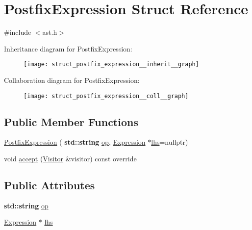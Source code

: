 \hypertarget{struct_postfix_expression}{}\section{Postfix\+Expression Struct Reference}
\label{struct_postfix_expression}


{\ttfamily \#include $<$ast.\+h$>$}



Inheritance diagram for Postfix\+Expression\+:\nopagebreak
\begin{figure}[H]
\begin{center}
\leavevmode
\texttt{[image: struct\_postfix\_expression\_\_inherit\_\_graph]}
\end{center}
\end{figure}


Collaboration diagram for Postfix\+Expression\+:\nopagebreak
\begin{figure}[H]
\begin{center}
\leavevmode
\texttt{[image: struct\_postfix\_expression\_\_coll\_\_graph]}
\end{center}
\end{figure}
\subsection*{Public Member Functions}
\begin{DoxyCompactItemize}
\item 
\hyperlink{struct_postfix_expression_a51cc535ac4af99bef2f292fb1ead6ad7}{Postfix\+Expression} (\textbf{ std\+::string} \hyperlink{struct_postfix_expression_a9ce1fb591d6787626d2eda8a9ca0a3cd}{op}, \hyperlink{struct_expression}{Expression} $\ast$\hyperlink{struct_postfix_expression_a33a5946e6ded6300ea8552325f22cba9}{lhs}=nullptr)
\item 
void \hyperlink{struct_postfix_expression_a2d814c990b7d1fb728f030a2673fe729}{accept} (\hyperlink{struct_visitor}{Visitor} \&visitor) const override
\end{DoxyCompactItemize}
\subsection*{Public Attributes}
\begin{DoxyCompactItemize}
\item 
\textbf{ std\+::string} \hyperlink{struct_postfix_expression_a9ce1fb591d6787626d2eda8a9ca0a3cd}{op}
\item 
\hyperlink{struct_expression}{Expression} $\ast$ \hyperlink{struct_postfix_expression_a33a5946e6ded6300ea8552325f22cba9}{lhs}
\end{DoxyCompactItemize}


